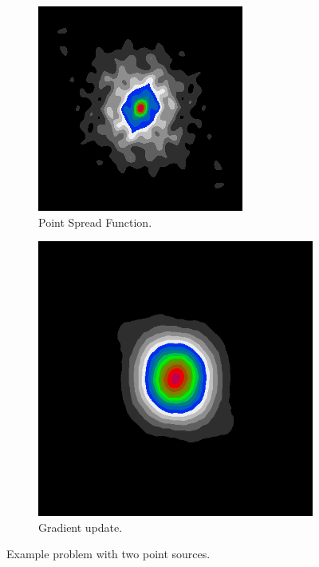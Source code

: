 \begin{figure}[!h]
	\centering
	\begin{subfigure}[b]{0.3\linewidth}
		\includegraphics[width=\linewidth]{./chapters/03.distribution/simulated/psf.png}
		\caption{Point Spread Function.}
		\label{cd:efficient:update:dirty}
	\end{subfigure}
	\begin{subfigure}[b]{0.3\linewidth}
		\includegraphics[width=\linewidth]{./chapters/03.distribution/simulated/psf2.png}
		\caption{Gradient update.}
		\label{cd:efficient:update:psf}
	\end{subfigure}
	\caption{Example problem with two point sources.}
	\label{cd:efficient:update:figure}
\end{figure}

